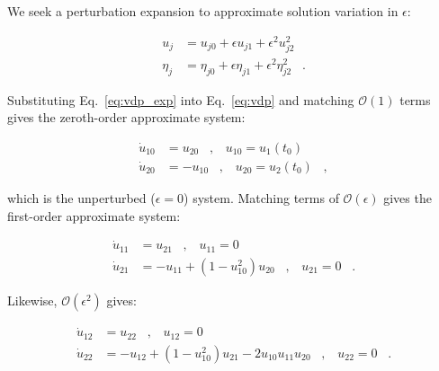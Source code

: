 \documentclass[11pt]{article}
\begin{document}
\noindent We seek a perturbation expansion to approximate solution variation in $\epsilon$:

\begin{equation}
        \label{eq:vdp_exp}
        \begin{aligned}
                u_j &= u_{j0} + \epsilon u_{j1} + \epsilon^2 u_{j2}^2 \\
                \eta_j &= \eta_{j0} + \epsilon \eta_{j1} + \epsilon^2 \eta_{j2}^2 \;\;\; .
        \end{aligned}
\end{equation}

\noindent Substituting Eq.~\ref{eq:vdp_exp} into Eq.~\ref{eq:vdp} and matching $\mathcal{O}(1)$ terms gives the zeroth-order approximate system:

\begin{equation}
        \label{eq:zeroorder_vdp}
        \begin{aligned}
                \dot{u}_{10} &= u_{20} \;\;\; , \;\;\; u_{10} = u_1(t_0) \\
                \dot{u}_{20} &= -u_{10} \;\;\; , \;\;\; u_{20} = u_2(t_0) \;\;\; ,
        \end{aligned}
\end{equation}

\noindent which is the unperturbed ($\epsilon=0$) system.
Matching terms of $\mathcal{O}(\epsilon)$ gives the first-order approximate system:

\begin{equation}
        \label{eq:firstorder_vdp}
        \begin{aligned}
                \dot{u}_{11} &= u_{21} \;\;\; , \;\;\; u_{11} = 0 \\
                \dot{u}_{21} &= -u_{11} + ( 1 - u_{10}^2 ) u_{20} \;\;\; , \;\;\; u_{21} = 0 \;\;\; .
        \end{aligned}
\end{equation}

\noindent Likewise, $\mathcal{O}(\epsilon^2)$ gives:

\begin{equation}
        \label{eq:secondorder_vdp}
        \begin{aligned}
                \dot{u}_{12} &= u_{22} \;\;\; , \;\;\; u_{12} = 0 \\
                \dot{u}_{22} &= -u_{12} + ( 1 - u_{10}^2 ) u_{21} - 2 u_{10} u_{11} u_{20} \;\;\; , \;\;\; u_{22} = 0 \;\;\; .
        \end{aligned}
\end{equation}
\end{document}
